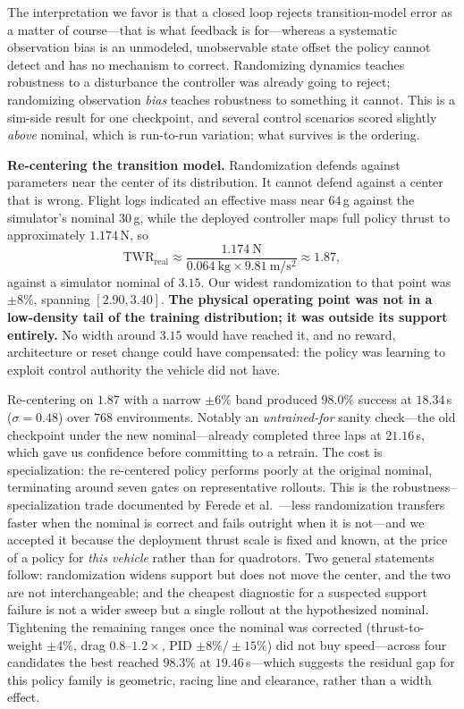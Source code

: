 \documentclass[10pt, twocolumn]{article}
\begin{document}
The interpretation we favor is that a closed loop rejects transition-model
error as a matter of course---that is what feedback is for---whereas a
systematic observation bias is an unmodeled, unobservable state offset the
policy cannot detect and has no mechanism to correct. Randomizing dynamics
teaches robustness to a disturbance the controller was already going to reject;
randomizing observation \emph{bias} teaches robustness to something it cannot.
This is a sim-side result for one checkpoint, and several control scenarios
scored slightly \emph{above} nominal, which is run-to-run variation; what
survives is the ordering.

\textbf{Re-centering the transition model.}
\label{sec:twr}
Randomization defends against parameters near the center of its distribution.
It cannot defend against a center that is wrong. Flight logs indicated an
effective mass near $64$\,g against the simulator's nominal $30$\,g, while the
deployed controller maps full policy thrust to approximately $1.174$\,N, so
\begin{equation}
\mathrm{TWR}_{\text{real}} \approx
\frac{1.174\ \mathrm{N}}{0.064\ \mathrm{kg} \times 9.81\ \mathrm{m/s^2}}
\approx 1.87 ,
\end{equation}
against a simulator nominal of $3.15$. Our widest randomization to that point
was $\pm8\%$, spanning $[2.90,3.40]$. \textbf{The physical operating point was
not in a low-density tail of the training distribution; it was outside its
support entirely.} No width around $3.15$ would have reached it, and no reward,
architecture or reset change could have compensated: the policy was learning to
exploit control authority the vehicle did not have.

Re-centering on $1.87$ with a narrow $\pm6\%$ band produced $98.0\%$ success at
$18.34$\,s ($\sigma = 0.48$) over $768$ environments. Notably an
\emph{untrained-for} sanity check---the old checkpoint under the new
nominal---already completed three laps at $21.16$\,s, which gave us confidence
before committing to a retrain. The cost is specialization: the re-centered
policy performs poorly at the original nominal, terminating around seven gates
on representative rollouts. This is the robustness--specialization trade
documented by Ferede et al.\ \cite{ferede2025}---less randomization transfers
faster when the nominal is correct and fails outright when it is not---and we
accepted it because the deployment thrust scale is fixed and known, at the
price of a policy for \emph{this vehicle} rather than for quadrotors. Two
general statements follow: randomization widens support but does not move the
center, and the two are not interchangeable; and the cheapest diagnostic for a
suspected support failure is not a wider sweep but a single rollout at the
hypothesized nominal. Tightening the remaining ranges once the nominal was
corrected (thrust-to-weight $\pm4\%$, drag $0.8$--$1.2\times$, PID
$\pm8\%/\pm15\%$) did not buy speed---across four candidates the best reached
$98.3\%$ at $19.46$\,s---which suggests the residual gap for this policy family
is geometric, racing line and clearance, rather than a width effect.
\end{document}
